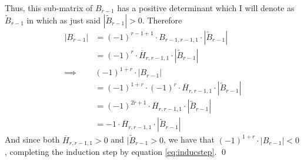 \documentclass[a4paper,12pt]{article}
\renewenvironment{proof}{{\textit{Proof} \\}}{\qed}
\begin{document}
\begin{proof}
Thus, this sub-matrix of $B_{r-1}$ has a positive determinant which I will denote as $\tilde{B}_{r-1}$
in which as just said $|\tilde{B}_{r-1}| > 0$.
Therefore
\begin{align*}
    |B_{r-1}| &= (-1)^{r-1+1} \cdot B_{r-1,r-1,1} \cdot |\tilde{B}_{r-1}| \\
    &=(-1)^{r} \cdot \overline{H}_{r,r-1,1} \cdot |\tilde{B}_{r-1}| \\
    \implies  &(-1)^{1+r} \cdot |B_{r-1}| \\
    &=  (-1)^{1+r} \cdot (-1)^{r} \cdot \overline{H}_{r,r-1,1} \cdot |\tilde{B}_{r-1}| \\
    &= (-1)^{2r + 1} \cdot \overline{H}_{r,r-1,1} \cdot |\tilde{B}_{r-1}| \\
    &= -1 \cdot \overline{H}_{r,r-1,1} \cdot |\tilde{B}_{r-1}|
\end{align*}
And since both $\overline{H}_{r,r-1,1} > 0$ and $|\tilde{B}_{r-1} > 0$, we have that
$(-1)^{1+r} \cdot |B_{r-1}| < 0$, completing the induction step by equation \eqref{eq:inducstep}.
\end{proof}
\end{document}
